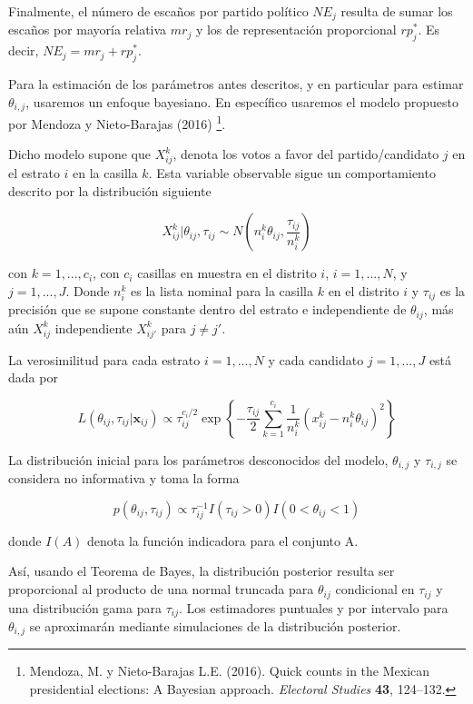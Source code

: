 \documentclass[]{article}
\let\rmarkdownfootnote\footnote%
\def\footnote{\protect\rmarkdownfootnote}
\begin{document}
Finalmente, el número de escaños por partido político $NE_j$ resulta de sumar los escaños por mayoría relativa $mr_j$ y los de representación proporcional $rp_j^*$. Es decir, $NE_j=mr_j+rp_j^*$. 

Para la estimación de los parámetros antes descritos, y en particular para estimar $\theta_{i,j}$, usaremos un enfoque bayesiano. En específico usaremos el modelo propuesto por Mendoza y Nieto-Barajas (2016) \footnote{Mendoza, M. y Nieto-Barajas L.E. (2016). Quick  counts  in  the  Mexican  presidential  elections:  A Bayesian approach. \textit{Electoral Studies} \textbf{43}, 124--132.}.

Dicho modelo supone que \(X_{ij}^k\), denota los votos a favor del partido/candidato $j$ en el estrato \(i\) en la casilla \(k\). Esta variable observable sigue un comportamiento descrito por la distribución siguiente

\begin{equation}
X_{ij}^k | \theta_{ij}, \tau_{ij} \sim N \left( n_{i}^k\theta_{ij},  \frac{\tau_{ij}}{n^k_{i}} \right)
\end{equation}

con \(k= 1, ..., c_i\), con \(c_i\) casillas en muestra en el distrito \(i\), \(i = 1, ..., N\), y \(j=1, ..., J\). Donde $n_i^k$ es la lista nominal para la casilla \(k\) en el distrito \(i\) y \(\tau_{ij}\) es la precisión que se supone constante dentro del estrato e independiente de \(\theta_{ij}\), más aún \(X_{ij}^k\) independiente \(X_{ij'}^k\) para \(j \neq j'\).

La verosimilitud para cada estrato \(i=1, ..., N\) y cada candidato \(j=1, ..., J\) está dada por

\begin{equation}
L(\theta_{ij}, \tau_{ij} | \mathbf{x}_{ij}) \propto \tau_{ij}^{c_i/2} \exp \left\{ -\frac{\tau_{ij}}{2} \sum_{k=1}^{c_i} \frac{1}{n_i^k}(x_{ij}^k - n^k_i \theta_{ij})^2 \right\}
\end{equation}

La distribución inicial para los parámetros desconocidos del modelo, $\theta_{i,j}$ y $\tau_{i,j}$ se considera no informativa y toma la forma

\begin{equation}
p(\theta_{ij}, \tau_{ij}) \propto \tau_{ij}^{-1}I(\tau_{ij}>0) I(0 < \theta_{ij} < 1)
\end{equation}

donde \(I(A)\) denota la función indicadora para el conjunto A.

Así, usando el Teorema de Bayes, la distribución posterior resulta ser proporcional al producto de una normal truncada para \(\theta_{ij}\) condicional en \(\tau_{ij}\) y una distribución gama para \(\tau_{ij}\). Los estimadores puntuales y por intervalo para $\theta_{i,j}$ se aproximarán mediante simulaciones de la distribución posterior. 
\end{document}
